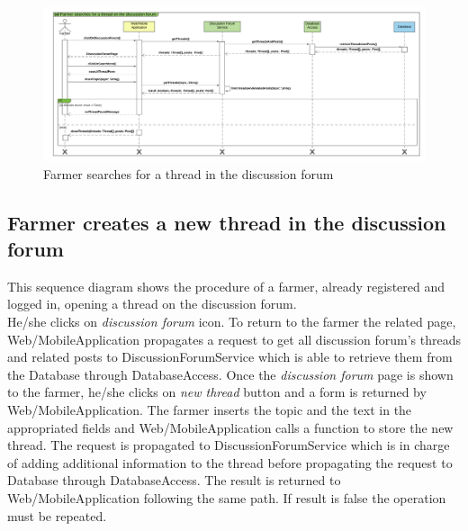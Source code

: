 \newpage
\begin{landscape}
\begin{figure}[h]
\vspace*{-2cm}
\noindent
\centering
\centerline{\includegraphics[scale= 0.108]{./Images/Sequence diagram/Farmer searches for a thread on the discussion forum.png}}
    \caption{Farmer searches for a thread in the discussion forum}
    \vspace*{-12cm}
\end{figure}
\fillandplacepagenumber
\end{landscape}

\subsection{Farmer creates a new thread in the discussion forum}

This sequence diagram shows the procedure of a farmer, already registered and logged in, opening a thread on the discussion forum.\\
He/she clicks on \textit{discussion forum} icon. To return to the farmer the related page, Web/MobileApplication propagates a request to get all discussion forum's threads and related posts to DiscussionForumService which is able to retrieve them from the Database through DatabaseAccess. 
Once the \textit{discussion forum} page is shown to the farmer, he/she clicks on \textit{new thread} button and a form is returned by Web/MobileApplication. The farmer inserts the topic and the text in the appropriated fields and Web/MobileApplication calls a function to store the new thread. The request is propagated to DiscussionForumService which is in charge of  adding additional information to the thread before propagating the request to Database through DatabaseAccess. The result is returned to Web/MobileApplication following the same path. If result is false the operation must be repeated.

